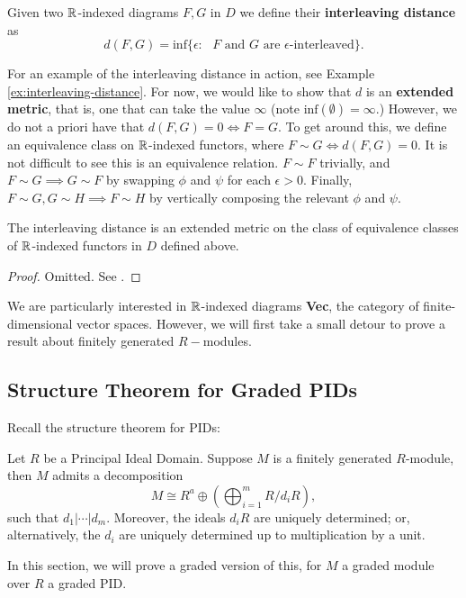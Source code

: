 \begin{definition}
    Given two $\mathbb{R}$-indexed diagrams $F,G$ in $D$ we define their \textbf{interleaving distance} as
    \[d(F,G)=\text{inf}\{\epsilon : \text{ $F$ and $G$ are $\epsilon$-interleaved}\}.\]
\end{definition}
For an example of the interleaving distance in action, see Example \ref{ex:interleaving-distance}. For now, we would like to show that $d$ is an \textbf{extended metric}, that is, one that can take the value $\infty$ (note $\text{inf}(\emptyset)=\infty.$) However, we do not a priori have that $d(F,G)=0\iff F=G$. To get around this, we define an equivalence class on $\mathbb{R}$-indexed functors, where $F\sim G\iff d(F,G)=0$. It is not difficult to see this is an equivalence relation. $F\sim F$ trivially, and $F\sim G\implies G\sim F$ by swapping $\phi$ and $\psi$ for each $\epsilon>0.$ Finally, $F\sim G, G\sim H\implies F\sim H$ by vertically composing the relevant $\phi$ and $\psi.$
\begin{lemma}
    The interleaving distance is an extended metric on the class of equivalence classes of $\mathbb{R}$-indexed functors in $D$ defined above.
\end{lemma}
\begin{proof}
Omitted. See \cite{Bubenik2014}.
\end{proof}

We are particularly interested in $\mathbb{R}$-indexed diagrams \textbf{Vec}, the category of finite-dimensional vector spaces. However, we will first take a small detour to prove a result about finitely generated $R-$modules.

\subsection{Structure Theorem for Graded PIDs} \label{sec:structurethm}

Recall the structure theorem for PIDs:

\begin{theorem} 
Let \(R\) be a Principal Ideal Domain. Suppose \(M\) is a finitely generated \(R\)-module, then \(M\) admits a decomposition
\[M \cong R^a \oplus \left(\bigoplus_{i=1}^{m}R/d_i R\right),\]
such that \(d_1|\cdots|d_m\). Moreover, the ideals $d_iR$ are uniquely determined; or, alternatively, the $d_i$ are uniquely determined up to multiplication by a unit.
\end{theorem}

In this section, we will prove a graded version of this, for \(M\) a graded module over \(R\) a graded PID.

